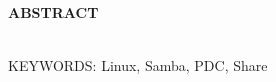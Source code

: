 \begin{center}
\textbf{ABSTRACT}
\end{center}

\singlespacing

\noindent  \\

\noindent KEYWORDS: Linux, Samba, PDC, Share
